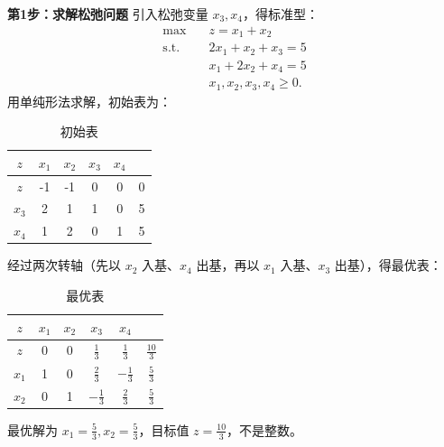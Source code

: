 \documentclass[12pt]{article}
\theoremstyle{plain}
\theoremstyle{definition}
\newcommand{\st}{\mathrel{\text{s.t.}}}
\begin{document}
\textbf{第1步：求解松弛问题}  
引入松弛变量 $x_3, x_4$，得标准型：
\begin{align*}
    \max \quad & z = x_1 + x_2 \\
    \st \quad & 2x_1 + x_2 + x_3 = 5 \\
    & x_1 + 2x_2 + x_4 = 5 \\
    & x_1, x_2, x_3, x_4 \ge 0.
\end{align*}
用单纯形法求解，初始表为：
\begin{table}[!htbp]
    \caption{初始表}
    \centering
    \begin{tabular}{c|cccc|c}
        \hline
        $z$ & $x_1$ & $x_2$ & $x_3$ & $x_4$ & \\ 
        \hline
        $z$ & -1 & -1 & 0 & 0 & 0 \\
        $x_3$ & 2 & 1 & 1 & 0 & 5 \\
        $x_4$ & 1 & 2 & 0 & 1 & 5 \\
        \hline
    \end{tabular}
\end{table}
经过两次转轴（先以 $x_2$ 入基、$x_4$ 出基，再以 $x_1$ 入基、$x_3$ 出基），得最优表：
\begin{table}[!htbp]
    \caption{最优表}
    \centering
    \begin{tabular}{c|cccc|c}
        \hline
        $z$ & $x_1$ & $x_2$ & $x_3$ & $x_4$ & \\ 
        \hline
        $z$ & 0 & 0 & $\frac{1}{3}$ & $\frac{1}{3}$ & $\frac{10}{3}$ \\
        $x_1$ & 1 & 0 & $\frac{2}{3}$ & $-\frac{1}{3}$ & $\frac{5}{3}$ \\
        $x_2$ & 0 & 1 & $-\frac{1}{3}$ & $\frac{2}{3}$ & $\frac{5}{3}$ \\
        \hline
    \end{tabular}    
\end{table}
最优解为 $x_1 = \frac{5}{3}, x_2 = \frac{5}{3}$，目标值 $z = \frac{10}{3}$，不是整数。
\end{document}
